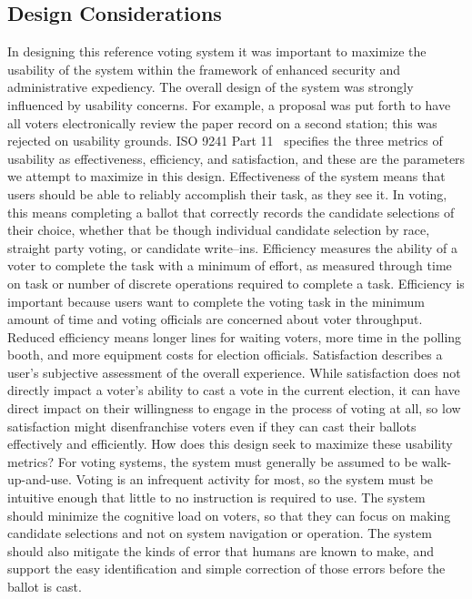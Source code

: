 \documentclass[letterpaper, 10pt, twocolumn]{article}
\begin{document}
\subsection{Design Considerations}
In designing this reference voting system it was important to maximize the usability of the system within the framework of enhanced security and administrative expediency. The overall design of the system was strongly influenced by usability concerns. For example, a proposal was put forth to have all voters electronically review the paper record on a second station; this was rejected on usability grounds.
ISO 9241 Part 11~\cite{iso1998} specifies the three metrics of usability as effectiveness, efficiency, and satisfaction, and these are the parameters we attempt to maximize in this design. Effectiveness of the system means that users should be able to reliably accomplish their task, as they see it. In voting, this means completing a ballot that correctly records the candidate selections of their choice, whether that be though individual candidate selection by race, straight party voting, or candidate write–ins. Efficiency measures the ability of a voter to complete the task with a minimum of effort, as measured through time on task or number of discrete operations required to complete a task. Efficiency is important because users want to complete the voting task in the minimum amount of time and voting officials are concerned about voter throughput. Reduced efficiency means longer lines for waiting voters, more time in the polling booth, and more equipment costs for election officials. Satisfaction describes a user's subjective assessment of the overall experience. While satisfaction does not directly impact a voter's ability to cast a vote in the current election, it can have direct impact on their willingness to engage in the process of voting at all, so low satisfaction might disenfranchise voters even if they can cast their ballots effectively and efficiently. 
How does this design seek to maximize these usability metrics? For voting systems, the system must generally be assumed to be walk-up-and-use. Voting is an infrequent activity for most, so the system must be intuitive enough that little to no instruction is required to use. The system should minimize the cognitive load on voters, so that they can focus on making candidate selections and not on system navigation or operation. The system should also mitigate the kinds of error that humans are known to make, and support the easy identification and simple correction of those errors before the ballot is cast. 
\end{document}

